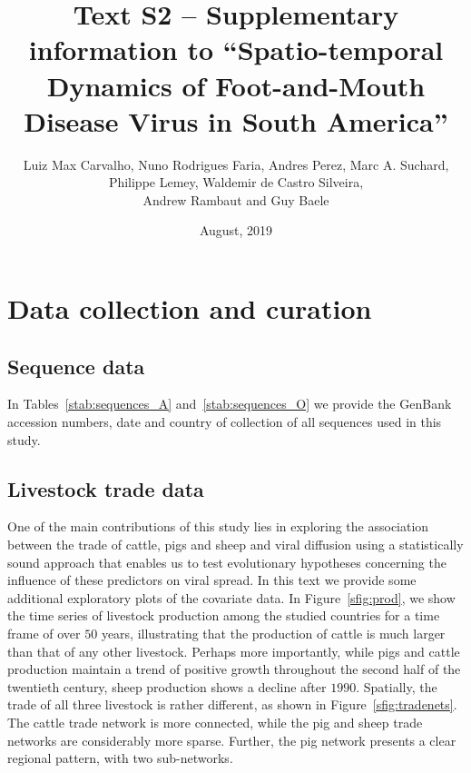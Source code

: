 \documentclass[a4paper,10pt]{article}
\title{Text S2 -- Supplementary information to ``Spatio-temporal Dynamics of Foot-and-Mouth Disease Virus in South America''}
\author{
Luiz Max Carvalho, Nuno Rodrigues Faria, Andres Perez,
Marc A. Suchard,\\ 
Philippe Lemey, Waldemir de Castro Silveira,\\
Andrew Rambaut and Guy Baele
}
\date{August, 2019}
\begin{document}
\maketitle

\section*{Data collection and curation}

\subsection*{Sequence data}

In Tables~\ref{stab:sequences_A} and~\ref{stab:sequences_O} we provide the GenBank accession numbers, date and country of collection of all sequences used in this study.

\subsection*{Livestock trade data}

One of the main contributions of this study lies in exploring the association between the trade of cattle, pigs and sheep and viral diffusion using a statistically sound approach that enables us to test evolutionary hypotheses concerning the influence of these predictors on viral spread. %
In this text we provide some additional exploratory plots of the covariate data.
In Figure~\ref{sfig:prod}, we show the time series of livestock production among the studied countries for a time frame of over $50$ years, illustrating that the production of cattle is much larger than that of any other livestock. %
Perhaps more importantly, while pigs and cattle production maintain a trend of positive growth throughout the second half of the twentieth century, sheep production shows a decline after $1990$.
Spatially, the trade of all three livestock is rather different, as shown in Figure~\ref{sfig:tradenets}. %
The cattle trade network is more connected, while the pig and sheep trade networks are considerably more sparse.
Further, the pig network presents a clear regional pattern, with two sub-networks. %
\end{document}
